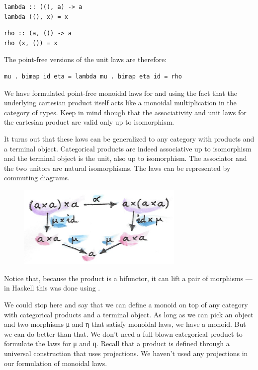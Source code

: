\begin{Verbatim}[commandchars=\\\{\}]
lambda :: ((), a) -> a
lambda ((), x) = x
\end{Verbatim}
\begin{Verbatim}[commandchars=\\\{\}]
rho :: (a, ()) -> a
rho (x, ()) = x
\end{Verbatim}
The point-free versions of the unit laws are therefore:

\begin{Verbatim}[commandchars=\\\{\}]
mu . bimap id eta = lambda mu . bimap eta id = rho
\end{Verbatim}
We have formulated point-free monoidal laws for  and
 using the fact that the underlying cartesian product itself
acts like a monoidal multiplication in the category of types. Keep in
mind though that the associativity and unit laws for the cartesian
product are valid only up to isomorphism.

It turns out that these laws can be generalized to any category with
products and a terminal object. Categorical products are indeed
associative up to isomorphism and the terminal object is the unit, also
up to isomorphism. The associator and the two unitors are natural
isomorphisms. The laws can be represented by commuting diagrams.

\begin{figure}[H]
\centering
\includegraphics[width=80mm]{images/assocmon.png}
\end{figure}

\noindent
Notice that, because the product is a bifunctor, it can lift a pair of
morphisms --- in Haskell this was done using .

We could stop here and say that we can define a monoid on top of any
category with categorical products and a terminal object. As long as we
can pick an object  and two morphisms μ and η that satisfy
monoidal laws, we have a monoid. But we can do better than that. We
don't need a full-blown categorical product to formulate the laws for μ
and η. Recall that a product is defined through a universal construction
that uses projections. We haven't used any projections in our
formulation of monoidal laws.

